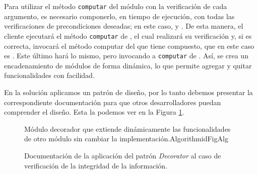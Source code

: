 Para utilizar el método \verb|computar| del módulo \MecanismoConcreto con la verificación de cada argumento, es necesario componerlo, en tiempo de ejecución, con todas las verificaciones de precondiciones deseadas; en este caso, \PrimerArgPositivo y \SegundoArgPar. De esta manera, el cliente ejecutará el método \verb|computar| de \PrimerArgPositivo, el cual realizará su verificación y, si es correcta, invocará el método computar del \Mecanismo que tiene compuesto, que en este caso es \SegundoArgPar. Este último hará lo mismo, pero invocando a \verb|computar| de \MecanismoConcreto. Así, se crea un encadenamiento de módulos de forma dinámica, lo que permite agregar y quitar funcionalidades con facilidad.

En la solución aplicamos un patrón de diseño, por lo tanto debemos presentar la correspondiente documentación para que otros desarrolladores puedan comprender el diseño. Esta la podemos ver en la Figura \ref{docDecorator}.

\begin{figure}[H]
\caption{Documentación de la aplicación del patrón \textit{Decorator} al caso de verificación de la integridad de la información.}
\label{docDecorator}
\begin{pattern}[]{Módulo decorador que extiende dinámicamente las funcionalidades de otro módulo sin cambiar la implementación.}{Algorithm}{idFigAlg}
\assigns
{}

\end{pattern}
\end{figure}

